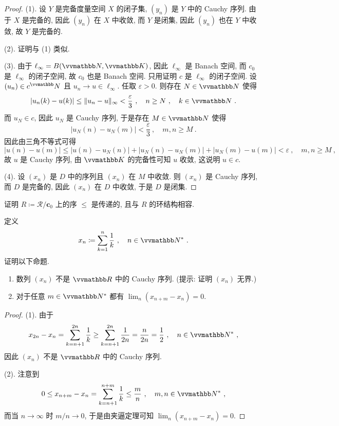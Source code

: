 \begin{proof}
    (1). 设 \(Y\) 是完备度量空间 \(X\) 的闭子集, \((y_n)\) 是 \(Y\) 中的 Cauchy 序列. 由于 \(X\) 是完备的, 因此 \((y_n)\) 在 \(X\) 中收敛, 而 \(Y\) 是闭集, 因此 \((y_n)\) 也在 \(Y\) 中收敛, 故 \(Y\) 是完备的.

    (2). 证明与 (1) 类似.

    (3). 由于 \(\ell_\infty = B(\N, \K)\), 因此 \(\ell_\infty\) 是 Banach 空间, 而 \(c_0\) 是 \(\ell_\infty\) 的闭子空间, 故 \(c_0\) 也是 Banach 空间. 只用证明 \(c\) 是 \(\ell_\infty\) 的闭子空间. 设 \((u_n) \in c^\N\) 且 \(u_n \to u \in \ell_\infty\). 任取 \(\varepsilon > 0\). 则存在 \(N \in \N\) 使得
    \[
        |u_n(k) - u(k)| \leq \|u_n - u\|_\infty < \frac{\varepsilon}{3}\ ,\quad n \geq N\ ,\quad k \in \N\ .
    \]
    而 \(u_N \in c\), 因此 \(u_N\) 是 Cauchy 序列, 于是存在 \(M \in \N\) 使得
    \[
        |u_N(n) - u_N(m)| < \frac{\varepsilon}{3}\ ,\quad m, n \geq M\ .
    \]
    因此由三角不等式可得
    \[
        |u(n) - u(m)| \leq |u(n) - u_N(n)| + |u_N(n) - u_N(m)| + |u_N(m) - u(m)| < \varepsilon\ ,\quad m, n \geq M\ ,
    \]
    故 \(u\) 是 Cauchy 序列, 由 \(\K\) 的完备性可知 \(u\) 收敛, 这说明 \(u \in c\).

    (4). 设 \((x_n)\) 是 \(D\) 中的序列且 \((x_n)\) 在 \(M\) 中收敛. 则 \((x_n)\) 是 Cauchy 序列, 而 \(D\) 是完备的, 因此 \((x_n)\) 在 \(D\) 中收敛, 于是 \(D\) 是闭集.
\end{proof}

\begin{exercise}
    证明 \(R \coloneqq \mathcal R / \bm c_0\) 上的序 \(\leq\) 是传递的, 且与 \(R\) 的环结构相容.
\end{exercise}

\begin{exercise}
    定义
    \[
        x_n \coloneqq \sum_{k = 1}^n \frac{1}{k}\ ,\quad n \in \N^\ast\ .
    \]
    证明以下命题.
    \begin{enumerate}
        \item 数列 \((x_n)\) 不是 \(\R\) 中的 Cauchy 序列. (提示: 证明 \((x_n)\) 无界.)
        \item 对于任意 \(m \in \N^\ast\) 都有 \(\lim_n (x_{n + m} - x_n) = 0\).
    \end{enumerate}
\end{exercise}

\begin{proof}
    (1). 由于
    \[
        x_{2 n} - x_n = \sum_{k = n + 1}^{2 n} \frac{1}{k} \geq \sum_{k = n + 1}^{2 n} \frac{1}{2 n} = \frac{n}{2 n} = \frac{1}{2}\ ,\quad n \in \N^\ast\ ,
    \]
    因此 \((x_n)\) 不是 \(\R\) 中的 Cauchy 序列.

    (2). 注意到
    \[
        0 \leq x_{n + m} - x_n = \sum_{k = n + 1}^{n + m} \frac{1}{k} \leq \frac{m}{n}\ ,\quad m, n \in \N^\ast\ ,
    \]
    而当 \(n \to \infty\) 时 \(m / n \to 0\), 于是由夹逼定理可知 \(\lim_n (x_{n + m} - x_n) = 0\).
\end{proof}

